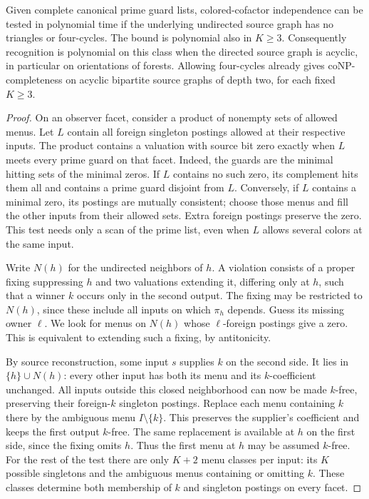 \begin{theorem}
\label{core:thm:girth-five-cofactor}
Given complete canonical prime guard lists, colored-cofactor independence
can be tested in polynomial time if the underlying undirected source graph
has no triangles or four-cycles. The bound is polynomial also in $K\ge3$.
Consequently recognition is polynomial on this class when the directed
source graph is acyclic, in particular on orientations of forests.
Allowing four-cycles already gives coNP-completeness on acyclic bipartite
source graphs of depth two, for each fixed $K\ge3$.
\end{theorem}
\begin{proof}
On an observer facet, consider a product of nonempty sets of allowed menus.
Let $L$ contain all foreign singleton postings allowed at their respective
inputs. The product contains a valuation with source bit zero exactly when
$L$ meets every prime guard on that facet. Indeed, the guards are the
minimal hitting sets of the minimal zeros. If $L$ contains no such zero,
its complement hits them all and contains a prime guard disjoint from $L$.
Conversely, if $L$ contains a minimal zero, its postings are mutually
consistent; choose those menus and fill the other inputs from their allowed
sets. Extra foreign postings preserve the zero. This test needs only a scan
of the prime list, even when $L$ allows several colors at the same input.

Write $N(h)$ for the undirected neighbors of $h$. A violation consists of
a proper fixing suppressing $h$ and two valuations extending it, differing
only at $h$, such that a winner $k$ occurs only in the second output.
The fixing may be restricted to $N(h)$, since these include all inputs on
which $\pi_h$ depends. Guess its missing owner $\ell$. We look for menus
on $N(h)$ whose $\ell$-foreign postings give a zero. This is equivalent
to extending such a fixing, by antitonicity.

By source reconstruction, some input $s$ supplies $k$ on the second side.
It lies in $\{h\}\cup N(h)$: every other input has both its menu and its
$k$-coefficient unchanged. All inputs outside this closed neighborhood
can now be made $k$-free, preserving their foreign-$k$ singleton postings.
Replace each menu containing $k$ there by the ambiguous menu
$I\setminus\{k\}$. This preserves the supplier's coefficient and keeps
the first output $k$-free. The same replacement is available at $h$ on
the first side, since the fixing omits $h$. Thus the first menu at $h$
may be assumed $k$-free. For the rest of the test there are only $K+2$
menu classes per input: its $K$ possible singletons and the ambiguous
menus containing or omitting $k$. These classes determine both membership
of $k$ and singleton postings on every facet.


\end{proof}
